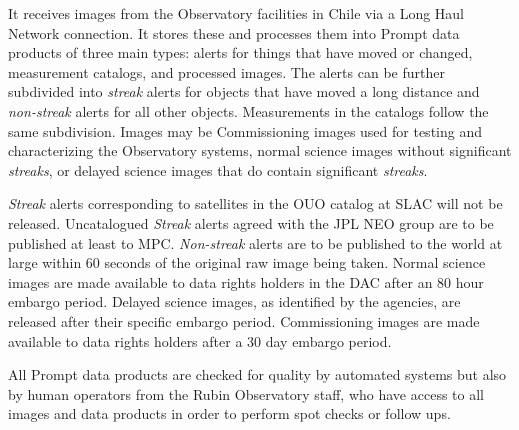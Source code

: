 It receives images from the Observatory facilities in Chile via a Long Haul Network connection.
It stores these and processes them into Prompt data products of three main types:
alerts for things that have moved or changed, measurement catalogs, and processed images.
The alerts can be further subdivided into \emph{streak} alerts for objects that have moved a long distance and \emph{non-streak} alerts for all other objects.
Measurements in the catalogs follow the same subdivision. Images may be \gls{Commissioning} images used for testing and characterizing the Observatory systems, normal science images without significant \emph{streaks}, or delayed science images that do contain significant \emph{streaks}.

\emph{Streak} alerts corresponding to satellites in the \gls{OUO} catalog at SLAC will not be released.
Uncatalogued \emph{Streak} alerts agreed with the \gls{JPL} \gls{NEO} group  are to be published at least to \gls{MPC}.
\emph{Non-streak} alerts are to be published to the world at large within 60 seconds of the original raw image being taken.
Normal science images are made available to data rights holders in the \gls{DAC} after an 80 hour embargo period.
Delayed science images, as identified by the agencies, are released after their specific embargo period. Commissioning images are made available to data rights holders after a 30 day embargo period.

All Prompt data products are checked for quality by automated systems but also by human operators from the Rubin Observatory staff, who have access to all images and data products in order to perform spot checks or follow ups.

